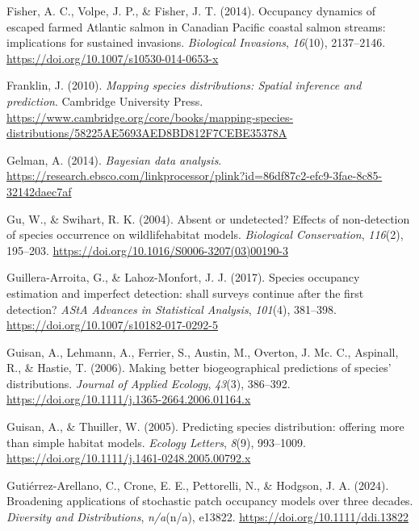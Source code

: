 \documentclass[
]{article}
\newlength{\cslhangindent}
\newenvironment{CSLReferences}[2] %
 {\begin{list}{}{%
  \setlength{\itemindent}{0pt}
  \setlength{\leftmargin}{0pt}
  \setlength{\parsep}{0pt}
  \ifodd #1
   \setlength{\leftmargin}{\cslhangindent}
   \setlength{\itemindent}{-1\cslhangindent}
  \fi
  \setlength{\itemsep}{#2\baselineskip}}}
 {\end{list}}
\begin{document}
\begin{CSLReferences}{1}{0}
Fisher, A. C., Volpe, J. P., \& Fisher, J. T. (2014). Occupancy dynamics
of escaped farmed Atlantic salmon in Canadian Pacific coastal salmon
streams: implications for sustained invasions. \emph{Biological
Invasions}, \emph{16}(10), 2137--2146.
\url{https://doi.org/10.1007/s10530-014-0653-x}

Franklin, J. (2010). \emph{Mapping species distributions: Spatial
inference and prediction}. Cambridge University Press.
\url{https://www.cambridge.org/core/books/mapping-species-distributions/58225AE5693AED8BD812F7CEBE35378A}

Gelman, A. (2014). \emph{Bayesian data analysis}.
\url{https://research.ebsco.com/linkprocessor/plink?id=86df87c2-efc9-3fae-8c85-32142daec7af}

Gu, W., \& Swihart, R. K. (2004). Absent or undetected? Effects of
non-detection of species occurrence on wildlife{\textendash}habitat
models. \emph{Biological Conservation}, \emph{116}(2), 195--203.
\url{https://doi.org/10.1016/S0006-3207(03)00190-3}

Guillera-Arroita, G., \& Lahoz-Monfort, J. J. (2017). Species occupancy
estimation and imperfect detection: shall surveys continue after the
first detection? \emph{AStA Advances in Statistical Analysis},
\emph{101}(4), 381--398. \url{https://doi.org/10.1007/s10182-017-0292-5}

Guisan, A., Lehmann, A., Ferrier, S., Austin, M., Overton, J. Mc. C.,
Aspinall, R., \& Hastie, T. (2006). Making better biogeographical
predictions of species{'} distributions. \emph{Journal of Applied
Ecology}, \emph{43}(3), 386--392.
\url{https://doi.org/10.1111/j.1365-2664.2006.01164.x}

Guisan, A., \& Thuiller, W. (2005). Predicting species distribution:
offering more than simple habitat models. \emph{Ecology Letters},
\emph{8}(9), 993--1009.
\url{https://doi.org/10.1111/j.1461-0248.2005.00792.x}

Gutiérrez-Arellano, C., Crone, E. E., Pettorelli, N., \& Hodgson, J. A.
(2024). Broadening applications of stochastic patch occupancy models
over three decades. \emph{Diversity and Distributions}, \emph{n/a}(n/a),
e13822. \url{https://doi.org/10.1111/ddi.13822}


\end{CSLReferences}
\end{document}
